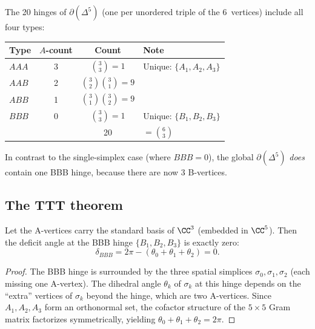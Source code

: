 The 20 hinges of $\partial(\Delta^5)$ (one per unordered triple of the 6~vertices) include all four types:

\begin{center}
\begin{tabular}{lccl}
\toprule
Type & $A$-count & Count & Note \\
\midrule
$AAA$ & 3 & $\binom{3}{3} = 1$ & Unique: $\{A_1, A_2, A_3\}$ \\
$AAB$ & 2 & $\binom{3}{2}\binom{3}{1} = 9$ & \\
$ABB$ & 1 & $\binom{3}{1}\binom{3}{2} = 9$ & \\
$BBB$ & 0 & $\binom{3}{3} = 1$ & Unique: $\{B_1, B_2, B_3\}$ \\
\midrule
& & 20 & $= \binom{6}{3}$ \\
\bottomrule
\end{tabular}
\end{center}

\noindent
In contrast to the single-simplex case (where $BBB = 0$), the global $\partial(\Delta^5)$ \emph{does} contain one BBB hinge, because there are now 3 B-vertices.

\subsection{The TTT theorem}
\label{sec:ttt}

\begin{theorem}
\label{thm:ttt}
Let the A-vertices carry the standard basis of $\CC^3$ (embedded in $\CC^5$).  Then the deficit angle at the BBB hinge $\{B_1, B_2, B_3\}$ is exactly zero:
\begin{equation}
\delta_{BBB} = 2\pi - (\theta_0 + \theta_1 + \theta_2) = 0.
\end{equation}
\end{theorem}

\begin{proof}
The BBB hinge is surrounded by the three spatial simplices $\sigma_0, \sigma_1, \sigma_2$ (each missing one A-vertex).  The dihedral angle $\theta_k$ of $\sigma_k$ at this hinge depends on the ``extra'' vertices of $\sigma_k$ beyond the hinge, which are two A-vertices.  Since $A_1, A_2, A_3$ form an orthonormal set, the cofactor structure of the $5 \times 5$ Gram matrix factorizes symmetrically, yielding $\theta_0 + \theta_1 + \theta_2 = 2\pi$.
\end{proof}

